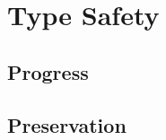 
\section{Type Safety}
\label{algorithmic:semantics}

\subsection{Progress}

\subsection{Preservation}

